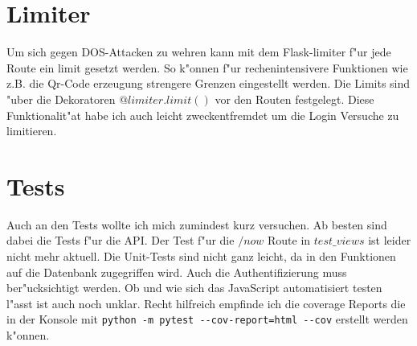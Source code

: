 \section{Limiter}\label{sec:limiter}
Um sich gegen DOS-Attacken zu wehren kann mit dem Flask-limiter f{"u}r jede Route ein limit gesetzt werden.
So k{"o}nnen f{"u}r rechenintensivere Funktionen wie z.B. die Qr-Code erzeugung strengere Grenzen eingestellt werden.
Die Limits sind {"u}ber die Dekoratoren $@limiter.limit()$ vor den Routen festgelegt.
Diese Funktionalit{"a}t habe ich auch leicht zweckentfremdet um die Login Versuche zu limitieren.

\section{Tests}\label{sec:tests}
\lstset{basicstyle=\selectfont\ttfamily}

Auch an den Tests wollte ich mich zumindest kurz versuchen.
Ab besten sind dabei die Tests f{"u}r die API.
Der Test f{"u}r die $/now$ Route in $test\_views$ ist leider nicht mehr aktuell.
Die Unit-Tests sind nicht ganz leicht, da in den Funktionen auf die Datenbank zugegriffen wird.
Auch die Authentifizierung muss ber{"u}cksichtigt werden.
Ob und wie sich das JavaScript automatisiert testen l{"a}sst ist auch noch unklar.
Recht hilfreich empfinde ich die coverage Reports die in der Konsole mit \lstinline$python -m pytest --cov-report=html --cov$ erstellt werden k{"o}nnen.
